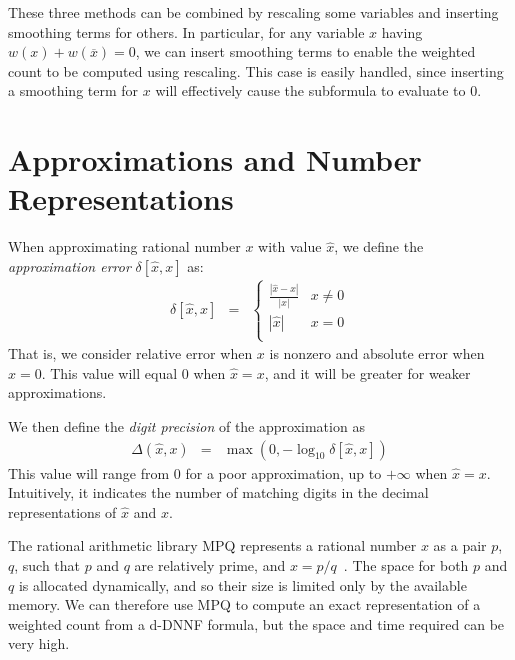 \documentclass[letterpaper,USenglish,cleveref, autoref, thm-restate]{lipics-v2021}
\newcommand{\obar}[1]{\overline{#1}}
\newcommand{\approximate}[1]{\hat{#1}}
\newcommand{\approxx}{\approximate{x}}
\newcommand{\aerror}{\delta}
\newcommand{\digitprecision}{\Delta}
\begin{document}
  These three methods can be combined by rescaling some variables and
  inserting smoothing terms for others.  In particular, for any
  variable $x$ having $w(x) + w(\obar{x}) = 0$, we can insert smoothing terms to enable the weighted count to be computed using rescaling.
This case is easily handled, since
inserting a smoothing term for $x$
  will effectively cause the subformula to evaluate to $0$.

\section{Approximations and Number Representations}
\label{sect:background:numbers}

When approximating rational number $x$ with value $\approximate{x}$, we
define the \emph{approximation error} $\aerror[\approxx, x]$ as:
\begin{eqnarray}
\aerror[\approxx, x] & = & \left\{ \begin{array}{ll}
  \frac{|\approxx - x|}{|x|}  & x \not = 0\\[0.8em]
  |\approxx| & x = 0\\
  \end{array} \right. \label{eqn:approx:error}
\end{eqnarray}
That is, we consider relative error when $x$ is nonzero and absolute error when $x=0$.
This value will equal 0 when $\approxx=x$, and it will be greater for weaker approximations.

We then define the \emph{digit precision} of the approximation as
\begin{eqnarray}
\digitprecision(\approxx, x) & = & \max(0, -\log_{10} \aerror[\approxx, x]) \label{eqn:digitprecision} 
\end{eqnarray}
This value will range from $0$ for a poor approximation, up to $+\infty$ when $\approxx=x$.
Intuitively, it indicates the number of matching digits in the decimal representations of $\approxx$ and $x$.

The rational arithmetic library MPQ represents a rational number $x$
as a pair $p$, $q$, such that $p$ and $q$ are relatively prime, and $x = p/q$~\cite{knuth:rational:1981}.
The space for both $p$ and $q$ is allocated dynamically, and
so their size is limited only by the available memory.  We can
therefore use MPQ to compute an exact representation of a weighted
count from a d-DNNF formula, but the space and time required can be very high.
\end{document}
